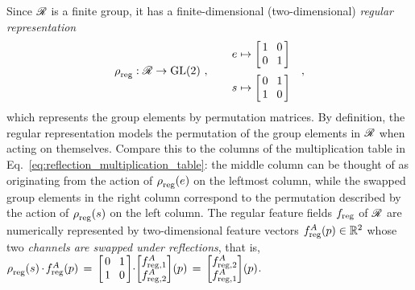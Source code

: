 Since $\mathscr{R}$ is a finite group, it has a finite-dimensional (two-dimensional) \emph{regular representation}
\begin{align}
    \rho_{\overset{}{\textup{reg}}}: \mathscr{R} \to \operatorname{GL}(2)\ , \qquad 
    \begin{aligned}
        e &\mapsto
            \begin{bmatrix} \hspace{1.5pt}
                1 &\mkern-4mu 0 \hspace*{1.5pt} \\ \hspace{1.5pt} 0 &\mkern-4mu 1 \hspace*{1.5pt}
            \end{bmatrix} \\[2pt]
        s &\mapsto 
            \begin{bmatrix} \hspace{1.5pt}
                0 &\mkern-4mu 1 \hspace*{1.5pt} \\ \hspace{1.5pt} 1 &\mkern-4mu 0 \hspace*{1.5pt}
            \end{bmatrix}
    \end{aligned}
    \quad ,
\end{align}
which represents the group elements by permutation matrices.
By definition, the regular representation models the permutation of the group elements in $\mathscr{R}$ when acting on themselves.
Compare this to the columns of the multiplication table in Eq.~\eqref{eq:reflection_multiplication_table}:
the middle column can be thought of as originating from the action of $\rho_{\overset{}{\textup{reg}}}(e)$ on the leftmost column, while the swapped group elements in the right column correspond to the permutation described by the action of $\rho_{\overset{}{\textup{reg}}}(s)$ on the left column.
The regular feature fields $f_{\textup{reg}}$ of $\mathscr{R}$ are numerically represented by two-dimensional feature vectors $f^A_{\textup{reg}}(p) \in \mathbb{R}^2$ whose two \emph{channels are swapped under reflections}, that is,
$
    \rho_{\overset{}{\textup{reg}}}(s) \mkern-1mu\cdot\mkern-2mu f^A_{\textup{reg}}(p)
    \,=\,
    \begin{bmatrix} \hspace{1.5pt} 0 &\mkern-4mu 1 \hspace*{1.5pt} \\ \hspace{1.5pt} 1 &\mkern-4mu 0 \hspace*{1.5pt} \end{bmatrix}
    \mkern-4mu \cdot\mkern-4mu 
    \begin{bmatrix} f^A_{\textup{reg},1} \\ f^A_{\textup{reg},2} \end{bmatrix} \!(p)
    \,=\,
    \begin{bmatrix} f^A_{\textup{reg},2} \\ f^A_{\textup{reg},1} \end{bmatrix} \!(p)
$.


